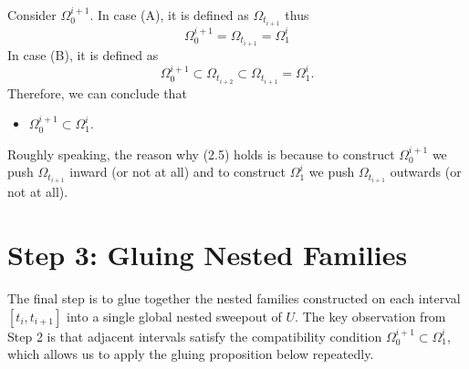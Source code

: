 Consider $\Omega_{0}^{i + 1}$. In case (A), it is defined as $\Omega_{t_{i + 1}}$ thus
\begin{equation*}
    \Omega_{0}^{i + 1} = \Omega_{t_{i + 1}} = \Omega_1^i
\end{equation*}
In case (B), it is defined as
\begin{equation*}
    \Omega_{0}^{i + 1} \subset \Omega_{t_{i + 2}} \subset \Omega_{t_{i + 1}} = \Omega_1^i.
\end{equation*}
Therefore, we can conclude that
\begin{itemize}
    \item[(2.5)] $\Omega_0^{i + 1}\subset \Omega_1^i$.
\end{itemize}
Roughly speaking, the reason why (2.5) holds is because to construct $\Omega_0^{i + 1}$ we push $\Omega_{t_{i + 1}}$ inward (or not at all) and to construct $\Omega_1^{i}$ we push $\Omega_{t_{i + 1}}$ outwards (or not at all).
\section{Step 3: Gluing Nested Families}

The final step is to glue together the nested families constructed on each interval $[t_i, t_{i+1}]$
into a single global nested sweepout of $U$. The key observation from Step 2 is that adjacent
intervals satisfy the compatibility condition $\Omega_0^{i+1} \subset \Omega_1^i$, which allows us
to apply the gluing proposition below repeatedly.

